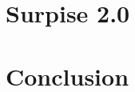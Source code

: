 \documentclass[a4paper,10pt]{report}
\begin{document}
		\subsection{}
		
		\subsection{}

\chapter{Surpise 2.0}

	\section{}
	
		\subsection{}
		
		\subsection{}
		
		\subsection{}
	
	\section{}
	
		\subsection{}
		
		\subsection{}
		
		\subsection{}
		
	\section{}
	
		\subsection{}
		
		\subsection{}
		
		\subsection{}

\chapter*{Conclusion}
\end{document}
